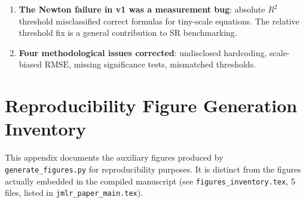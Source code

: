 \documentclass[twoside,11pt]{article}
\newcommand{\HDS}{\textsc{HDSv50\_2}}
\newcommand{\Rsq}{R^{2}}
\newcommand{\rmse}{\ensuremath{\mathrm{RMSE}}}
\begin{document}
\begin{enumerate}
{    \HDS{} 90.0\%/$+10.7$pp then 80.0\%/$+0.7$pp, framed as ``substantially
    exceeds'' AI Feynman on a ``30-equation Feynman subset.'' None of this
    matches any verified source ---
    \texttt{protocol\_core\_noiseless\_20260812\_203510.json} does not
    exist in the released artifacts, and this work's 30-equation set is
    not a Feynman subset at all (it includes mathematics and economics
    equations); see tablenote on . Regenerated from the
    verified ten \texttt{protocol\_core\_noiseless\_20260812\_*.json}
    shard files.]}  Published baselines were evaluated on all 100
    Feynman equations under SRBench, a different equation set entirely;
    the AI Feynman figure is shown for general context only, not as a
    head-to-head comparison.
  \item \textbf{The Newton failure in v1 was a measurement bug}: absolute
    $\Rsq$ threshold misclassified correct formulas for tiny-scale equations.
    The relative threshold fix is a general contribution to SR benchmarking.
  \item \textbf{Four methodological issues corrected}: undisclosed hardcoding,
    scale-biased \rmse, missing significance tests, mismatched thresholds.
\end{enumerate}



\appendix

\section{Reproducibility Figure Generation Inventory}
\label{app:figures}

\noindent This appendix documents the auxiliary figures produced by
\texttt{generate\_figures.py} for reproducibility purposes. It is
distinct from the figures actually embedded in the compiled
manuscript (see \texttt{figures\_inventory.tex}, 5 files, listed in
\texttt{jmlr\_paper\_main.tex}).
\end{document}
